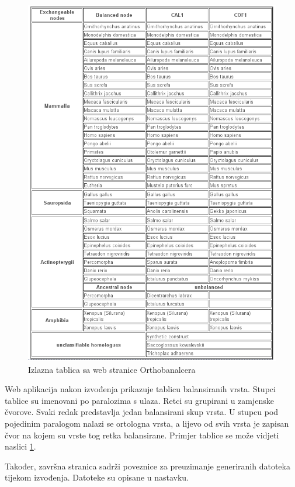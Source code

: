 \begin{figure}[h!]
\centering
\includegraphics[width=5.4in]{figures/tablica.png}
\caption{Izlazna tablica sa web stranice Orthobanalcera}
\label{fig:tablica}
\end{figure}

Web aplikacija nakon izvođenja prikazuje tablicu balansiranih vrsta.  Stupci
tablice su imenovani po paralozima s ulaza. Retci su grupirani u zamjenske
čvorove. Svaki redak predstavlja jedan balansirani skup vrsta. U stupcu pod
pojedinim paralogom nalazi se ortologna vrsta, a lijevo od svih vrsta je zapisan
čvor na kojem su vrste tog retka balansirane. Primjer tablice se može vidjeti
naslici \ref{fig:tablica}.

Također, završna stranica sadrži poveznice za preuzimanje generiranih datoteka
tijekom izvođenja. Datoteke su opisane u nastavku.

